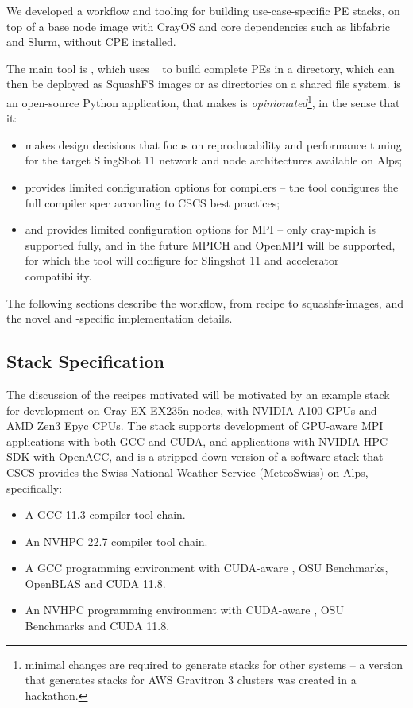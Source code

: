 We developed a workflow and tooling for building use-case-specific PE stacks, on top of a base node image with CrayOS and core dependencies such as libfabric and Slurm, without CPE installed.

The main tool is \href{https://github.com/eth-cscs/stackinator}{\stackinator}, which uses \spack~\cite{gamblin:sc15} to build complete PEs in a directory, which can then be deployed as SquashFS images or as directories on a shared file system.
\stackinator is an open-source Python application, that makes is \emph{opinionated}\footnote{minimal changes are required to generate stacks for other systems -- a version that generates stacks for AWS Gravitron 3 clusters was created in a hackathon.}, in the sense that it:
\begin{itemize}
    \item makes design decisions that focus on reproducability and performance tuning for the target SlingShot 11 network and node architectures available on Alps;
    \item provides limited configuration options for compilers -- the tool configures the full compiler spec according to CSCS best practices;
    \item and provides limited configuration options for MPI -- only cray-mpich is supported fully, and in the future MPICH and OpenMPI will be supported, for which the tool will configure for Slingshot 11 and accelerator compatibility.
\end{itemize}

The following sections describe the workflow, from recipe to squashfs-images, and the novel and \crayex-specific implementation details.

\subsection{Stack Specification}

The discussion of the \spack recipes motivated will be motivated by an example stack for development on Cray EX EX235n nodes, with NVIDIA A100 GPUs and AMD Zen3 Epyc CPUs. The stack supports development of GPU-aware MPI applications with both GCC and CUDA, and applications with NVIDIA HPC SDK with OpenACC, and is a stripped down version of a software stack that CSCS provides the Swiss National Weather Service (MeteoSwiss) on Alps, specifically:
\begin{itemize}
    \item A GCC 11.3 compiler tool chain.
    \item An NVHPC 22.7 compiler tool chain.
    \item A GCC programming environment  with CUDA-aware \craympich, OSU Benchmarks, OpenBLAS and CUDA 11.8.
    \item An NVHPC programming environment  with CUDA-aware \craympich, OSU Benchmarks and CUDA 11.8.
\end{itemize}

